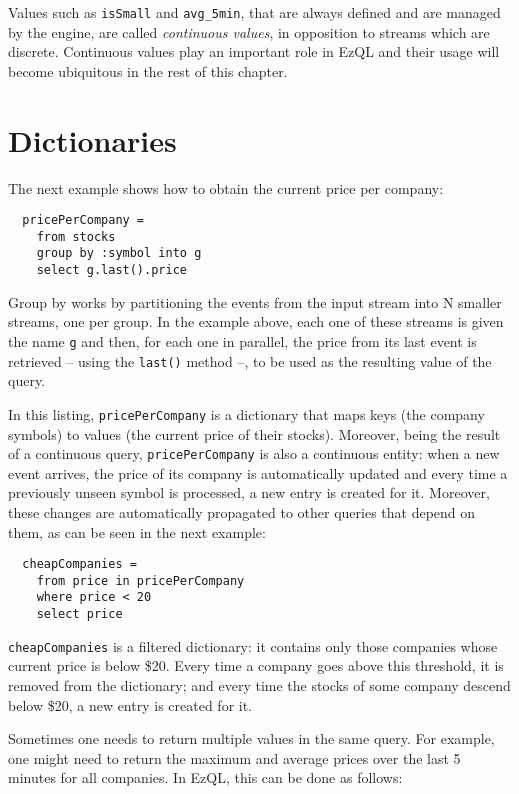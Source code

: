 \documentclass[a4,11pt]{report}
\begin{document}
Values such as \verb=isSmall= and \verb=avg_5min=, that are always
defined and are managed by the engine, are called \emph{continuous
  values}, in opposition to streams which are discrete. Continuous
values play an important role in EzQL and their usage will become
ubiquitous in the rest of this chapter.

\section{Dictionaries}

The next example shows how to obtain the current price per company:

\begin{lstlisting}
  pricePerCompany =
    from stocks
    group by :symbol into g
    select g.last().price
\end{lstlisting}

Group by works by partitioning the events from the input stream into N
smaller streams, one per group. In the example above, each one of
these streams is given the name \verb=g= and then, for each one in
parallel, the price from its last event is retrieved -- using the
\verb=last()= method --, to be used as the resulting value of the
query.

In this listing, \verb=pricePerCompany= is a dictionary that maps keys
(the company symbols) to values (the current price of their
stocks). Moreover, being the result of a continuous query,
\verb=pricePerCompany= is also a continuous entity: when a new event
arrives, the price of its company is automatically updated and every
time a previously unseen symbol is processed, a new entry is created
for it. Moreover, these changes are automatically propagated to other
queries that depend on them, as can be seen in the next example:

\begin{lstlisting}
  cheapCompanies =
    from price in pricePerCompany
    where price < 20
    select price
\end{lstlisting}

\verb=cheapCompanies= is a filtered dictionary: it contains only those
companies whose current price is below \$20. Every time a company goes
above this threshold, it is removed from the dictionary; and every
time the stocks of some company descend below \$20, a new entry is
created for it.

Sometimes one needs to return multiple values in the same query. For
example, one might need to return the maximum and average prices over
the last 5 minutes for all companies. In EzQL, this can be done as
follows:
\end{document}
